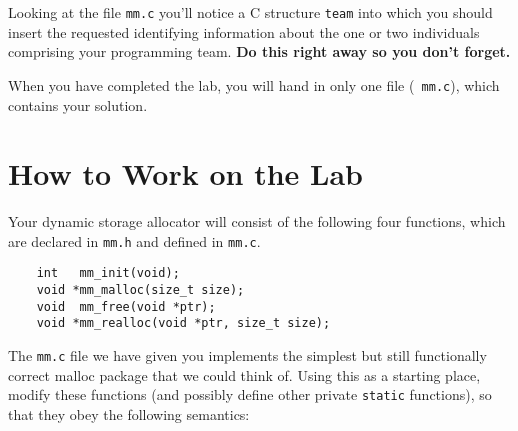 \documentclass[11pt]{article}
\begin{document}
Looking at the file {\tt mm.c} you'll notice a C structure {\tt team}
into which you should insert the requested identifying information
about the one or two individuals comprising your programming team.
{\bf Do this right away so you don't forget.}

When you have completed the lab, you will hand in only one file ({\tt
mm.c}), which contains your solution.

\section{How to Work on the Lab}

Your dynamic storage allocator will consist of the following four
functions, which are declared in {\tt mm.h} and defined in
{\tt mm.c}.

\begin{verbatim}
    int   mm_init(void);
    void *mm_malloc(size_t size);
    void  mm_free(void *ptr);
    void *mm_realloc(void *ptr, size_t size);
\end{verbatim}
The {\tt mm.c} file we have given you implements the simplest but
still functionally correct malloc package that we could think
of. Using this as a starting place, modify these functions (and
possibly define other private {\tt static} functions), so that they
obey the following semantics:
\end{document}
